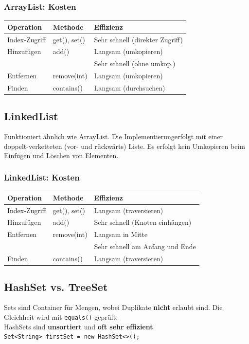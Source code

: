 \subsubsection{ArrayList: Kosten}
\begin{tabular}{l l l} \hline
    \textbf{Operation} & \textbf{Methode} & \textbf{Effizienz} \\ \hline
    Index-Zugriff & get(), set() & \color{green!80!black}Sehr schnell (direkter Zugriff) \\
    Hinzufügen    & add()        & \color{red}Langsam (umkopieren) \\
                  &              & \color{green!80!black}Sehr schnell (ohne umkop.) \\
    Entfernen     & remove(int)  & \color{red}Langsam (umkopieren) \\
    Finden        & contains()   & \color{red}Langsam (durchsuchen) \\
\end{tabular}

\subsection{LinkedList}
Funktioniert ähnlich wie ArrayList. Die Implementierungerfolgt mit einer doppelt-verketteten (vor- und rückwärts) Liste.
Es erfolgt kein Umkopieren beim Einfügen und Löschen von Elementen.

\subsubsection{LinkedList: Kosten}
\begin{tabular}{l l l} \hline
    \textbf{Operation} & \textbf{Methode} & \textbf{Effizienz} \\ \hline
    Index-Zugriff & get(), set() & \color{red} Langsam (traversieren) \\
    Hinzufügen    & add()        & \color{green!80!black}Sehr schnell (Knoten einhängen)\\
    Entfernen     & remove(int)  & \color{red}Langsam in Mitte \\
                  &              & \color{green!80!black}Sehr schnell am Anfang und Ende \\
    Finden        & contains()   & \color{red}Langsam (traversieren) \\
\end{tabular}

\subsection{HashSet vs. TreeSet}
Sets sind Container für Mengen, wobei Duplikate \textbf{nicht} erlaubt sind. Die Gleichheit wird mit \verb|equals()| geprüft.\\
HashSets sind \textbf{unsortiert} und \textbf{oft sehr effizient}\\
\verb|Set<String> firstSet = new HashSet<>();|

